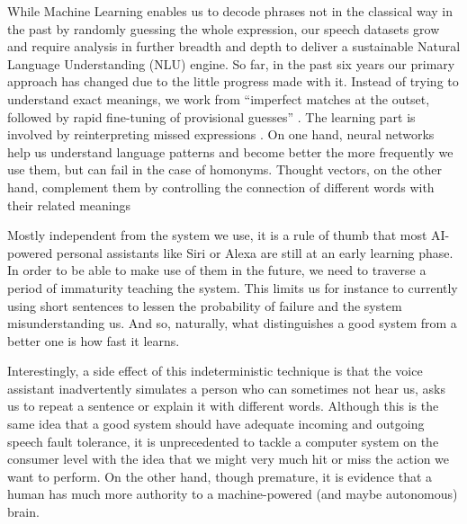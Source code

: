 
While Machine Learning enables us to decode phrases not in the classical way in the past by randomly guessing the whole expression, our speech datasets grow and require analysis in further breadth and depth to deliver a sustainable Natural Language Understanding (NLU) engine.
So far, in the past six years our primary approach has changed due to the little progress made with it. Instead of trying to understand exact meanings, we work from
``imperfect matches at the outset, followed by rapid fine-tuning of provisional guesses'' \cite{mit:Alexa}. The learning part is involved by reinterpreting missed expressions \cite{aws:lex_webinar}. 
On one hand, neural networks help us understand language patterns and become better the more frequently we use them, but can fail in the case of homonyms. \cite{mit:AILang} Thought vectors, on the other hand, complement them by controlling the connection of different words with their related meanings %

Mostly independent from the system we use, it is %
a rule of thumb that most AI-powered personal assistants like Siri or Alexa are %
still at an early learning phase. In order to be able to make use of them in the future, %
we need to traverse a period of immaturity teaching the system.
This limits us for instance to currently using short sentences to lessen the probability of failure and the system misunderstanding us. And so, naturally, what distinguishes a good system from a better one is how fast it learns.


Interestingly, a side effect of this indeterministic technique is that the voice assistant inadvertently simulates a person who can sometimes not hear us, asks us to repeat a sentence or explain it with different words. Although this is the same idea that a good system should have adequate incoming and outgoing speech fault tolerance, it is unprecedented to tackle a computer system on the consumer level with the idea that we might very much hit or miss the action we want to perform. On the other hand, though premature, it is evidence that a human has much more authority to a machine-powered (and maybe autonomous) brain.


